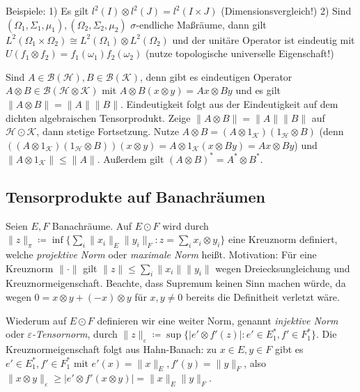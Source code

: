 \documentclass[11pt,a4paper]{scrartcl}
\newcommand{\Hc}{\mathcal{H}}
\newcommand{\Kc}{\mathcal{K}}
\newcommand{\B}{\mathcal{B}}
\theoremstyle{plain}
\theoremstyle{definition}
\theoremstyle{remark}
\begin{document}
Beispiele: 1) Es gilt $l^2(I)\otimes l^2(J) = l^2(I\times J)$ (Dimensionsvergleich!) 2) Sind $(\Omega_1, \Sigma_1,\mu_1), (\Omega_2,\Sigma_2,\mu_2)$ $\sigma$-endliche Maßräume, dann gilt $L^2(\Omega_1\times \Omega_2) \cong L^2(\Omega_1)\otimes L^2(\Omega_2)$ und der unitäre Operator ist eindeutig mit $U(f_1\otimes f_2) = f_1(\omega_1)f_2(\omega_2)$ (nutze topologische universelle Eigenschaft!)

Sind $A\in \B(\Hc), B\in \B(\Kc)$, denn gibt es eindeutigen Operator $A\otimes B\in \B(\Hc\otimes \Kc)$ mit $A\otimes B(x\otimes y)=Ax\otimes By$ und es gilt $\|A\otimes B\|=\|A\|\|B\|$. Eindeutigkeit folgt aus der Eindeutigkeit auf dem dichten algebraischen Tensorprodukt. Zeige $\|A\otimes B\|=\|A\|\|B\|$ auf $\Hc \odot \Kc$, dann stetige Fortsetzung. Nutze $A\otimes B=(A\otimes 1_\Kc)(1_\Hc\otimes B)$ (denn $((A\otimes 1_\Kc)(1_\Hc\otimes B))(x\otimes y)=A\otimes 1_\Kc(x\otimes By)=Ax\otimes By$) und $\|A\otimes 1_\Kc\| \leq \|A\|$. Außerdem gilt $(A\otimes B)^*=A^*\otimes B^*$.

\subsection{Tensorprodukte auf Banachräumen}

Seien $E,F$ Banachräume. Auf $E\odot F$ wird durch $\|z\|_\pi \coloneqq \inf \{ \sum_i \|x_i\|_E \|y_i\|_F: z = \sum_i x_i \otimes y_i \}$ eine Kreuznorm definiert, welche \emph{projektive Norm} oder \emph{maximale Norm} heißt. Motivation: Für eine Kreuznorm $\|\cdot\|$ gilt $\|z\|\leq \sum_i \|x_i\|\|y_i\|$ wegen Dreiecksungleichung und Kreuznormeigenschaft. Beachte, dass Supremum keinen Sinn machen würde, da wegen $0=x\otimes y + (-x)\otimes y$ für $x,y\neq 0$ bereits die Definitheit verletzt wäre.

Wiederum auf $E\odot F$ definieren wir eine weiter Norm, genannt \emph{injektive Norm} oder \emph{$\varepsilon$-Tensornorm}, durch $\|z\|_\varepsilon \coloneqq \sup \{ |e'\otimes f'(z)|: e'\in E^*_1, f'\in F^*_1 \}$. Die Kreuznormeigenschaft folgt aus Hahn-Banach: zu $x\in E, y\in F$ gibt es $e'\in E^*_1, f'\in F^*_1$ mit $e'(x)=\|x\|_E, f'(y)=\|y\|_F$, also $\|x\otimes y\|_\varepsilon \geq |e'\otimes f'(x\otimes y)|=\|x\|_E \|y\|_F$.
\end{document}
